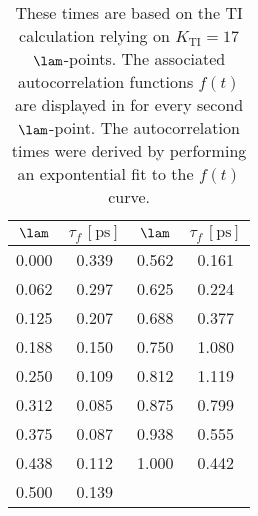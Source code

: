 \begin{table}[H]
  \centering
\caption{\footnotesize{} These times are based on the TI calculation relying on $K_{\mathrm{TI}}=17$ $\lam$-points. The associated autocorrelation functions $f(t)$ are displayed in  for every second $\lam$-point. The autocorrelation times were derived by performing an expontential fit to the $f(t)$ curve.
}
\label{tab:tcf}
\begin{tabular}{*{2}{c} | *{2}{c}}
\hline
$\lam$ & $\tau_{f}\,[\mathrm{ps}]$ & $\lam$ & $\tau_{f}\,[\mathrm{ps}]$ \\
\hline
\hline
     0.000 &      0.339  &     0.562 &      0.161 \\
     0.062 &      0.297  &     0.625 &      0.224 \\
     0.125 &      0.207  &     0.688 &      0.377 \\
     0.188 &      0.150  &     0.750 &      1.080 \\
     0.250 &      0.109  &     0.812 &      1.119 \\
     0.312 &      0.085  &     0.875 &      0.799 \\
     0.375 &      0.087  &     0.938 &      0.555 \\
     0.438 &      0.112  &     1.000 &      0.442 \\
     0.500 &      0.139  &
\end{tabular}
\end{table}



\newcommand\avgti[1]{\subgraph{fig:avgti:#1}{conv_mad_#1_ene_ana.pgf}{0.45}%
}

%

